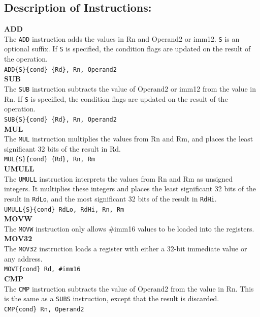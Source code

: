 \documentclass[12pt]{article}
\begin{document}
\subsection{Description of Instructions:}
\textbf{ADD}\\
The \verb|ADD| instruction adds the values in Rn and Operand2 or imm12. \verb|S| is an optional suffix. If \verb|S| is specified, the condition flags are updated on the result of the operation.\\
\verb|ADD{S}{cond} {Rd}, Rn, Operand2|\\
\textbf{SUB}\\
The \verb|SUB|  instruction subtracts the value of Operand2 or imm12 from the value in Rn. If \verb|S| is specified, the condition flags are updated on the result of the operation.\\
\verb|SUB{S}{cond} {Rd}, Rn, Operand2|\\
\textbf{MUL}\\
The \verb|MUL| instruction multiplies the values from Rn and Rm, and places the least significant 32 bits of the result in Rd.\\
\verb|MUL{S}{cond} {Rd}, Rn, Rm|\\
\textbf{UMULL}\\
The \verb|UMULL| instruction interprets the values from Rn and Rm as unsigned integers. It multiplies these integers and places the least significant 32 bits of the result in \verb|RdLo|, and the most significant 32 bits of the result in \verb|RdHi|.\\
\verb|UMULL{S}{cond} RdLo, RdHi, Rn, Rm|\\
\textbf{MOVW}\\The \verb|MOVW| instruction only allows \#imm16 values to be loaded into the registers. \\
\textbf{MOV32} \\ The \verb|MOV32| instruction loads a register with either a 32-bit immediate value or any address.\\
\verb|MOVT{cond} Rd, #imm16|\\
\textbf{CMP}\\
The \verb|CMP| instruction subtracts the value of Operand2 from the value in Rn. This is the same as a \verb|SUBS| instruction, except that the result is discarded.\\
\verb|CMP{cond} Rn, Operand2|\\
\pagebreak
\end{document}
